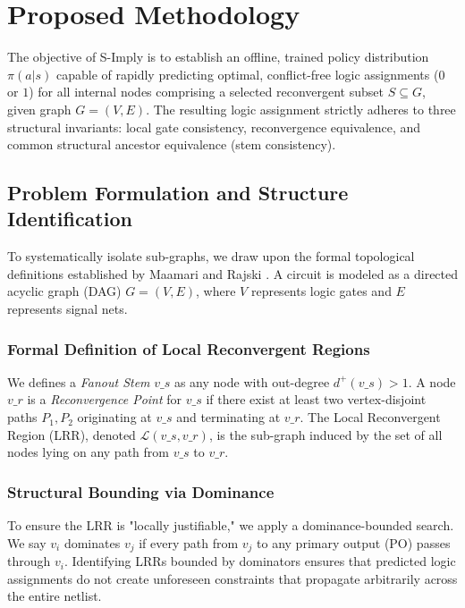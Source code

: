 \documentclass[conference]{IEEEtran}
\begin{document}
\section{Proposed Methodology}

The objective of S-Imply is to establish an offline, trained policy distribution $\pi(a|s)$ capable of rapidly predicting optimal, conflict-free logic assignments ($0$ or $1$) for all internal nodes comprising a selected reconvergent subset $S \subseteq G$, given graph $G=(V, E)$. The resulting logic assignment strictly adheres to three structural invariants: local gate consistency, reconvergence equivalence, and common structural ancestor equivalence (stem consistency).

\subsection{Problem Formulation and Structure Identification}

To systematically isolate sub-graphs, we draw upon the formal topological definitions established by Maamari and Rajski \cite{maamari1990fault}. A circuit is modeled as a directed acyclic graph (DAG) $G=(V, E)$, where $V$ represents logic gates and $E$ represents signal nets.

\subsubsection{Formal Definition of Local Reconvergent Regions}
We defines a \textit{Fanout Stem} $v\_s$ as any node with out-degree $d^+(v\_s) > 1$. A node $v\_r$ is a \textit{Reconvergence Point} for $v\_s$ if there exist at least two vertex-disjoint paths $P_1, P_2$ originating at $v\_s$ and terminating at $v\_r$. The Local Reconvergent Region (LRR), denoted $\mathcal{L}(v\_s, v\_r)$, is the sub-graph induced by the set of all nodes lying on any path from $v\_s$ to $v\_r$.

\subsubsection{Structural Bounding via Dominance}
To ensure the LRR is "locally justifiable," we apply a dominance-bounded search. We say $v_i$ dominates $v_j$ if every path from $v_j$ to any primary output (PO) passes through $v_i$. Identifying LRRs bounded by dominators ensures that predicted logic assignments do not create unforeseen constraints that propagate arbitrarily across the entire netlist.
\end{document}
